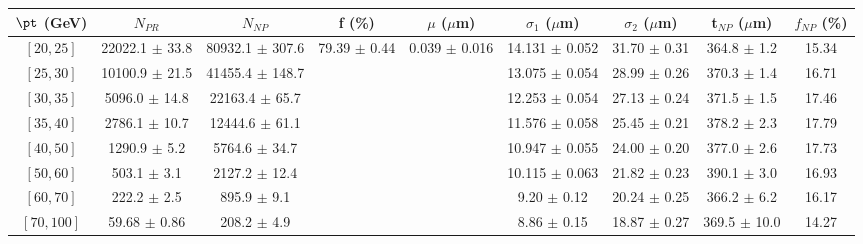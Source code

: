 \begin{tabular}{c||c|c|c|c|c|c|c||c}
$\pt$ (GeV) & $N_{PR}$ & $N_{NP}$ & f (\%) & $\mu$ ($\mu$m) & $\sigma_1$ ($\mu$m) & $\sigma_2$ ($\mu$m)  & t$_{NP}$ ($\mu$m) & $f_{NP}$ (\%) \\
\hline
$[20, 25]$ & 22022.1 $\pm$ 33.8 & 80932.1 $\pm$ 307.6 & \multirow{8}{*}{79.39 $\pm$ 0.44} & \multirow{8}{*}{0.039 $\pm$ 0.016} & 14.131 $\pm$ 0.052 & 31.70 $\pm$ 0.31 & 364.8 $\pm$ 1.2 & 15.34\\
$[25, 30]$ & 10100.9 $\pm$ 21.5 & 41455.4 $\pm$ 148.7 &  &  & 13.075 $\pm$ 0.054 & 28.99 $\pm$ 0.26 & 370.3 $\pm$ 1.4 & 16.71\\
$[30, 35]$ & 5096.0 $\pm$ 14.8 & 22163.4 $\pm$ 65.7 &  &  & 12.253 $\pm$ 0.054 & 27.13 $\pm$ 0.24 & 371.5 $\pm$ 1.5 & 17.46\\
$[35, 40]$ & 2786.1 $\pm$ 10.7 & 12444.6 $\pm$ 61.1 &  &  & 11.576 $\pm$ 0.058 & 25.45 $\pm$ 0.21 & 378.2 $\pm$ 2.3 & 17.79\\
$[40, 50]$ & 1290.9 $\pm$ 5.2 & 5764.6 $\pm$ 34.7 &  &  & 10.947 $\pm$ 0.055 & 24.00 $\pm$ 0.20 & 377.0 $\pm$ 2.6 & 17.73\\
$[50, 60]$ & 503.1 $\pm$ 3.1 & 2127.2 $\pm$ 12.4 &  &  & 10.115 $\pm$ 0.063 & 21.82 $\pm$ 0.23 & 390.1 $\pm$ 3.0 & 16.93\\
$[60, 70]$ & 222.2 $\pm$ 2.5 & 895.9 $\pm$ 9.1 &  &  & 9.20 $\pm$ 0.12 & 20.24 $\pm$ 0.25 & 366.2 $\pm$ 6.2 & 16.17\\
$[70, 100]$ & 59.68 $\pm$ 0.86 & 208.2 $\pm$ 4.9 &  &  & 8.86 $\pm$ 0.15 & 18.87 $\pm$ 0.27 & 369.5 $\pm$ 10.0 & 14.27\\
\end{tabular}
